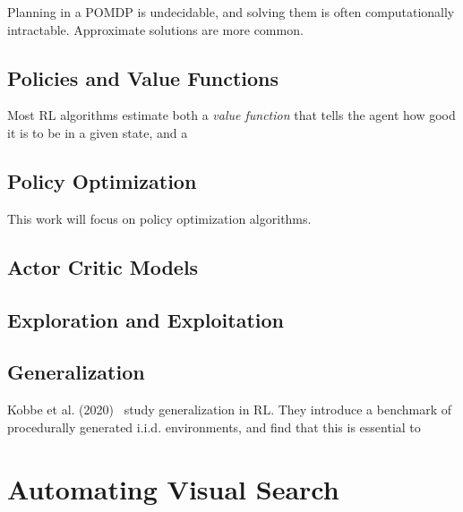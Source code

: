 Planning in a POMDP is undecidable, and solving them is often computationally intractable.
Approximate solutions are more common.


\subsection{Policies and Value Functions}

Most RL algorithms estimate both a \textit{value function} that tells the agent how good it is to be in a given state, and a 


\subsection{Policy Optimization}

This work will focus on policy optimization algorithms.

\subsection{Actor Critic Models}

\subsection{Exploration and Exploitation}




\subsection{Generalization}




Kobbe et al. (2020)~\cite{} study generalization in RL. They introduce a benchmark of procedurally generated i.i.d. environments, and find that this is essential to 

\section{Automating Visual Search}


